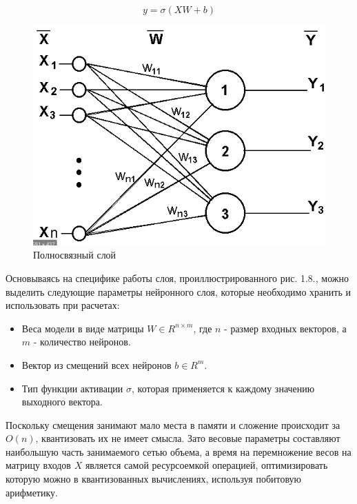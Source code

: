 \begin{equation}
y = \sigma (XW + b)
\end{equation}

\begin{figure}[H]
    \begin{center}
        \includegraphics[scale=0.3]{tex/inc/img/layer.jpg}
        \caption{Полносвязный слой}
    \end{center}
\end{figure}

Основываясь на специфике работы слоя, проиллюстрированного рис. 1.8., можно выделить следующие параметры нейронного слоя, которые необходимо хранить и использовать при расчетах:

\begin{itemize}
    \item Веса модели в виде матрицы $W \in R^{n \times m}$, где $n$ - размер входных векторов, а $m$ - количество нейронов.
    \item Вектор из смещений всех нейронов $b \in R^{m}$.
    \item Тип функции активации $\sigma$, которая применяется к каждому значению выходного вектора.
\end{itemize}

Поскольку смещения занимают мало места в памяти и сложение происходит за $O(n)$, квантизовать их не имеет смысла. Зато весовые параметры составляют наибольшую часть занимаемого сетью объема, а время на перемножение весов на матрицу входов $X$ является самой ресурсоемкой операцией, оптимизировать которую можно в квантизованных вычислениях, используя побитовую арифметику. 

